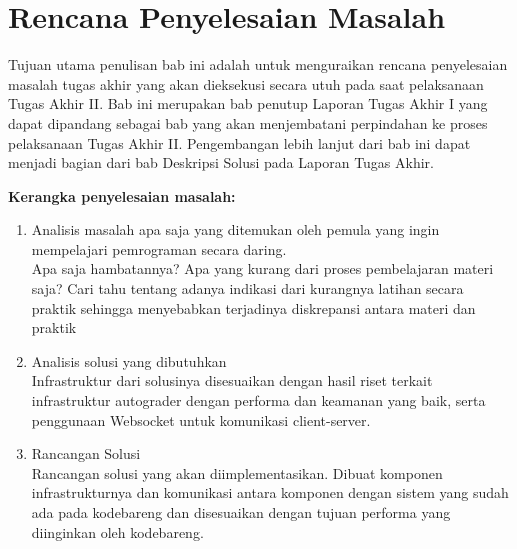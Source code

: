 \chapter{Rencana Penyelesaian Masalah}

Tujuan utama penulisan bab ini adalah untuk menguraikan rencana penyelesaian masalah tugas akhir yang akan dieksekusi secara utuh pada saat pelaksanaan Tugas Akhir II. Bab ini merupakan bab penutup Laporan Tugas Akhir I yang dapat dipandang sebagai bab yang akan menjembatani perpindahan ke proses pelaksanaan Tugas Akhir II. Pengembangan lebih lanjut dari bab ini dapat menjadi bagian dari bab Deskripsi Solusi pada Laporan Tugas Akhir.

\textbf{Kerangka penyelesaian masalah:}
\begin{enumerate}
  \item Analisis masalah apa saja yang ditemukan oleh pemula yang ingin mempelajari pemrograman secara daring. \\
        Apa saja hambatannya? Apa yang kurang dari proses pembelajaran materi saja? Cari tahu tentang adanya indikasi dari kurangnya latihan secara praktik sehingga menyebabkan terjadinya diskrepansi antara materi dan praktik
  \item Analisis solusi yang dibutuhkan \\
        Infrastruktur dari solusinya disesuaikan dengan hasil riset terkait infrastruktur autograder dengan performa dan keamanan yang baik, serta penggunaan Websocket untuk komunikasi client-server.
  \item Rancangan Solusi \\
        Rancangan solusi yang akan diimplementasikan. Dibuat komponen infrastrukturnya dan komunikasi antara komponen dengan sistem yang sudah ada pada kodebareng dan disesuaikan dengan tujuan performa yang diinginkan oleh kodebareng.
\end{enumerate}